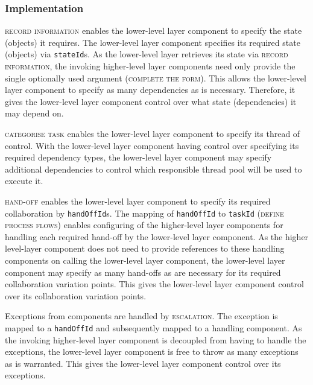 \documentclass[prodmode]{style/acmlarge}
\begin{document}
\subsubsection*{Implementation}

\textsc{record information} enables the lower-level layer component to specify
the state (objects) it requires.  The lower-level layer component specifies its
required state (objects) via \texttt{stateId}s.  As the lower-level layer
retrieves its state via \textsc{record information}, the invoking higher-level
layer components need only provide the single optionally used argument
(\textsc{complete the form}).  This allows the lower-level layer component to
specify as many dependencies as is necessary.  Therefore, it gives the
lower-level layer component control over what state (dependencies) it
may depend on.

\textsc{categorise task} enables the lower-level layer component to specify its
thread of control.  With the lower-level layer component having control over
specifying its required dependency types, the lower-level layer component may
specify additional dependencies to control which responsible thread pool will be
used to execute it.

\textsc{hand-off} enables the lower-level layer component to specify its
required collaboration by \texttt{handOffId}s.  The mapping of
\texttt{handOffId} to \texttt{taskId} (\textsc{define process flows}) enables
configuring of the higher-level layer components for handling each required
hand-off by the lower-level layer component.  As the higher level-layer
component does not need to provide references to these handling components on
calling the lower-level layer component, the lower-level layer component may
specify as many hand-offs as are necessary for its required collaboration
variation points.  This gives the lower-level layer component control over its
collaboration variation points.

Exceptions from components are handled by \textsc{escalation}.  The exception is
mapped to a \texttt{handOffId} and subsequently mapped to a handling component. 
As the invoking higher-level layer component is decoupled from having to handle
the exceptions, the lower-level layer component is free to throw as many
exceptions as is warranted.  This gives the lower-level layer component control
over its exceptions.
\end{document}
